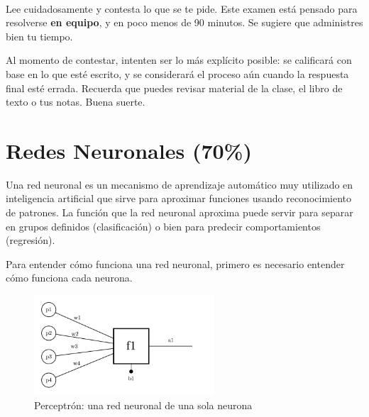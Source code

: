 \documentclass{article}
\title{
    \myclass \\
    \textbf{\mytitle} \\
    \myheader
    \date{}
}
\begin{document}
\maketitle

\vspace{-1.5cm}

Lee cuidadosamente y contesta lo que se te pide.
Este examen está pensado para resolverse \textbf{en equipo}, y en poco menos de 90 minutos.
Se sugiere que administres bien tu tiempo.

Al momento de contestar, intenten ser lo más explícito posible: se calificará con base en lo que esté escrito, y se considerará el proceso aún cuando la respuesta final esté errada.
Recuerda que puedes revisar material de la clase, el libro de texto o tus notas.
Buena suerte.

\section{Redes Neuronales (70\%)}

Una red neuronal es un mecanismo de aprendizaje automático muy utilizado en inteligencia artificial que sirve para aproximar funciones usando reconocimiento de patrones.
La función que la red neuronal aproxima puede servir para separar en grupos definidos (clasificación) o bien para predecir comportamientos (regresión).

Para entender cómo funciona una red neuronal, primero es necesario entender cómo funciona cada neurona.

\begin{figure}[htbp]
    \centering
    \includegraphics[width=0.6\textwidth]{perceptron.pdf}
    \caption{Perceptrón: una red neuronal de una sola neurona}
    \label{fig:perceptron}
\end{figure}
\end{document}
